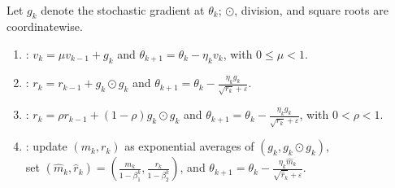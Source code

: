 \begin{definition} \label{def:sl-momentum-adaptive-methods} \\
Let $g_k$ denote the stochastic gradient at $\theta_k$; $\odot$, division, and square roots are coordinatewise.
\begin{enumerate}[label=(\roman*)]
\setlength{\itemsep}{0pt}
\item {}: $v_k=\mu v_{k-1}+g_k$ and $\theta_{k+1}=\theta_k-\eta_kv_k$, with $0\leq\mu<1$.
\item {}: $r_k=r_{k-1}+g_k\odot g_k$ and $\theta_{k+1}=\theta_k-\frac{\eta_kg_k}{\sqrt{r_k}+\varepsilon}$.
\item {}: $r_k=\rho r_{k-1}+(1-\rho)g_k\odot g_k$ and $\theta_{k+1}=\theta_k-\frac{\eta_kg_k}{\sqrt{r_k}+\varepsilon}$, with $0<\rho<1$.
\item {}: update $(m_k,r_k)$ as exponential averages of $(g_k,g_k\odot g_k)$,\\
set $(\widehat m_k,\widehat r_k)=(\frac{m_k}{1-\beta_1^k},\frac{r_k}{1-\beta_2^k})$, and $\theta_{k+1}=\theta_k-\frac{\eta_k\widehat m_k}{\sqrt{\widehat r_k}+\varepsilon}$.
\end{enumerate}
\end{definition}
